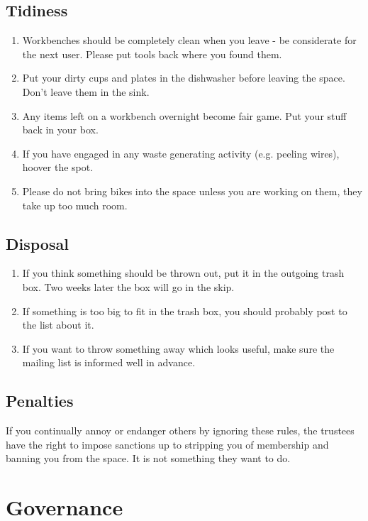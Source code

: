 \documentclass[11pt,a5paper,twoside]{memoir}
\begin{document}
\subsection{Tidiness}

\begin{enumerate}
	\item Workbenches should be completely clean when you leave - be considerate for the next user. Please put tools back where you found them.
	\item Put your dirty cups and plates in the dishwasher before leaving the space. Don't leave them in the sink.
	\item Any items left on a workbench overnight become fair game. Put your stuff back in your box.
	\item If you have engaged in any waste generating activity (e.g. peeling wires), hoover the spot.
	\item Please do not bring bikes into the space unless you are working on them, they take up too much room.
\end{enumerate}

\subsection{Disposal}

\begin{enumerate}
	\item If you think something should be thrown out, put it in the outgoing trash box. Two weeks later the box will go in the skip.
	\item If something is too big to fit in the trash box, you should probably post to the list about it.
	\item If you want to throw something away which looks useful, make sure the mailing list is informed well in advance.
\end{enumerate}

\subsection{Penalties}

If you continually annoy or endanger others by ignoring these rules, the trustees have the right to impose sanctions up to stripping you of membership and banning you from the space. It is not something they want to do.

\section{Governance}
\end{document}
